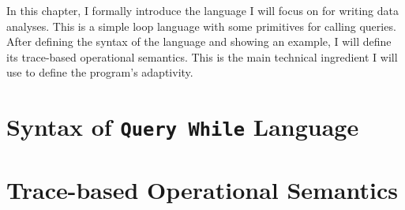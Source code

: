 In this chapter, I formally introduce the language I will focus on for writing data analyses.  
This is a simple loop language with some primitives for calling queries. 
After defining the syntax of the language and showing an example, I will define its trace-based operational semantics. 
This is the main technical ingredient I will use to define the program's adaptivity.

\section{Syntax of {\tt Query While} Language}
\label{sec:language-syntax}

\section{Trace-based Operational Semantics}
\label{sec:language-os}

